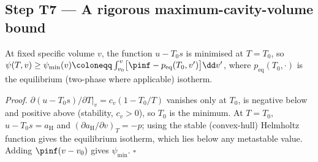 \subsection{Step T7 --- A rigorous maximum-cavity-volume bound}\label{sec:vmax}
\begin{lemma}\label{lem:helm}
At fixed specific volume $v$, the function $u-T_0s$ is minimised at $T=T_0$, so
$\psi(T,v)\ge\psi_{\min}(v)\coloneqq\int_{v_0}^{v}\bigl[\pinf-p_{\mathrm{eq}}(T_0,v')\bigr]\dd v'$, where
$p_{\mathrm{eq}}(T_0,\cdot)$ is the equilibrium (two-phase where applicable) isotherm.
\end{lemma}
\emph{Proof.} $\partial(u-T_0s)/\partial T|_v=c_v(1-T_0/T)$ vanishes only at $T_0$, is negative below and
positive above (stability, $c_v>0$), so $T_0$ is the minimum. At $T=T_0$, $u-T_0s=a_{\mathrm H}$ and
$(\partial a_{\mathrm H}/\partial v)_T=-p$; using the stable (convex-hull) Helmholtz function gives the
equilibrium isotherm, which lies below any metastable value. Adding $\pinf(v-v_0)$ gives $\psi_{\min}$. $\square$

